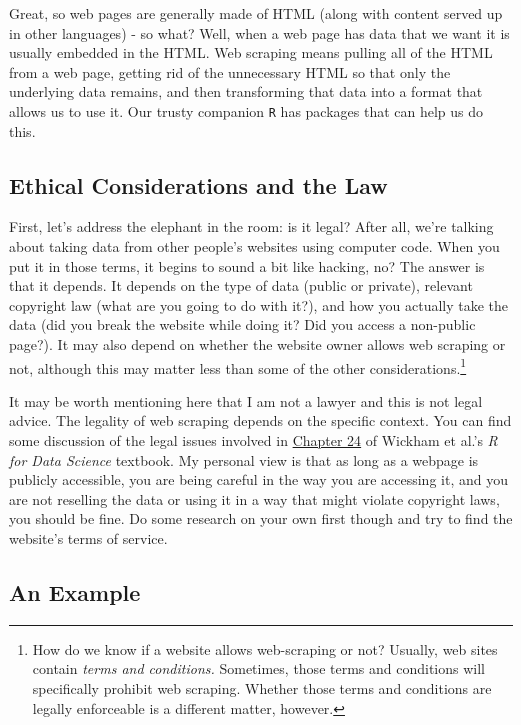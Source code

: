 \documentclass[
  letterpaper,
]{book}
\begin{document}
Great, so web pages are generally made of HTML (along with content
served up in other languages) - so what? Well, when a web page has data
that we want it is usually embedded in the HTML. Web scraping means
pulling all of the HTML from a web page, getting rid of the unnecessary
HTML so that only the underlying data remains, and then transforming
that data into a format that allows us to use it. Our trusty companion
\texttt{R} has packages that can help us do this.

\hypertarget{ethical-considerations-and-the-law}{%
\subsection{Ethical Considerations and the
Law}\label{ethical-considerations-and-the-law}}

First, let's address the elephant in the room: is it legal? After all,
we're talking about taking data from other people's websites using
computer code. When you put it in those terms, it begins to sound a bit
like hacking, no? The answer is that it depends. It depends on the type
of data (public or private), relevant copyright law (what are you going
to do with it?), and how you actually take the data (did you break the
website while doing it? Did you access a non-public page?). It may also
depend on whether the website owner allows web scraping or not, although
this may matter less than some of the other considerations.\footnote{How
  do we know if a website allows web-scraping or not? Usually, web sites
  contain \emph{terms and conditions.} Sometimes, those terms and
  conditions will specifically prohibit web scraping. Whether those
  terms and conditions are legally enforceable is a different matter,
  however.}

It may be worth mentioning here that I am not a lawyer and this is not
legal advice. The legality of web scraping depends on the specific
context. You can find some discussion of the legal issues involved in
\href{https://r4ds.hadley.nz/webscraping}{Chapter 24} of Wickham et
al.'s \emph{R for Data Science} textbook. My personal view is that as
long as a webpage is publicly accessible, you are being careful in the
way you are accessing it, and you are not reselling the data or using it
in a way that might violate copyright laws, you should be fine. Do some
research on your own first though and try to find the website's terms of
service.

\hypertarget{an-example}{%
\subsection{An Example}\label{an-example}}
\end{document}
